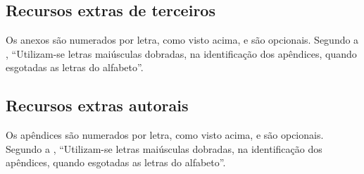 \documentclass[
	12pt,				%
	openright,			%
	oneside,			%
	a4paper,			%
	sumario=tradicional, %
	english,			%
	french,				%
	spanish,			%
	brazil				%
	]{uastex}
\begin{document}

\begin{referencias}
	
\end{referencias}

\begin{anexosenv}
	
	\chapter{Recursos extras de terceiros}\label{anex:recursos_terceiros}
	Os anexos são numerados por letra, como visto acima, e são opcionais. Segundo a \cite{NBR14724:2011}, ``Utilizam-se letras maiúsculas dobradas, na identificação dos apêndices, quando esgotadas as letras do alfabeto''.
	
	\lipsum[30]


\end{anexosenv}


\begin{apendicesenv}

	\chapter{Recursos extras autorais}\label{apen:recursos_autorais}
	Os apêndices são numerados por letra, como visto acima, e são opcionais. Segundo a \cite{NBR14724:2011}, ``Utilizam-se letras maiúsculas dobradas, na identificação dos apêndices, quando esgotadas as letras do alfabeto''.
	
	\lipsum[50]

\end{apendicesenv}
\end{document}
